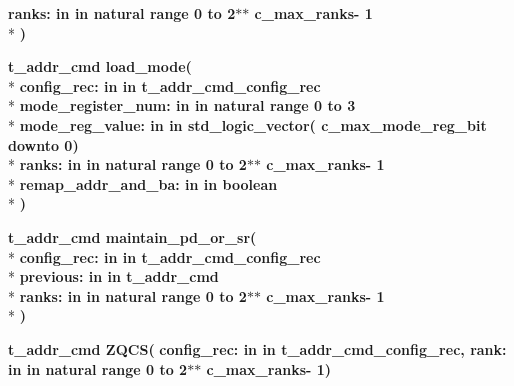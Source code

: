 \begin{DoxyCompactItemize}
{\bfseries \textcolor{vhdlchar}{ranks\+: }\textcolor{stringliteral}{in }\textcolor{vhdlchar}{in natural   range  0 to  2$\ast$$\ast$   c\+\_\+max\+\_\+ranks-\/ 1}}\\*
{\bfseries  )} 
\item 
{\bfseries {\bfseries \textcolor{vhdlchar}{t\+\_\+addr\+\_\+cmd}\textcolor{vhdlchar}{ }}} {\bf load\+\_\+mode}{\bfseries  ( }\\*
{\bfseries \textcolor{vhdlchar}{config\+\_\+rec\+: }\textcolor{stringliteral}{in }\textcolor{vhdlchar}{in t\+\_\+addr\+\_\+cmd\+\_\+config\+\_\+rec}}\\*
{\bfseries \textcolor{vhdlchar}{mode\+\_\+register\+\_\+num\+: }\textcolor{stringliteral}{in }\textcolor{vhdlchar}{in natural   range  0 to  3}}\\*
{\bfseries \textcolor{vhdlchar}{mode\+\_\+reg\+\_\+value\+: }\textcolor{stringliteral}{in }\textcolor{vhdlchar}{in std\+\_\+logic\+\_\+vector(   c\+\_\+max\+\_\+mode\+\_\+reg\+\_\+bit downto  0)}}\\*
{\bfseries \textcolor{vhdlchar}{ranks\+: }\textcolor{stringliteral}{in }\textcolor{vhdlchar}{in natural   range  0 to  2$\ast$$\ast$   c\+\_\+max\+\_\+ranks-\/ 1}}\\*
{\bfseries \textcolor{vhdlchar}{remap\+\_\+addr\+\_\+and\+\_\+ba\+: }\textcolor{stringliteral}{in }\textcolor{vhdlchar}{in boolean}}\\*
{\bfseries  )} 
\item 
{\bfseries {\bfseries \textcolor{vhdlchar}{t\+\_\+addr\+\_\+cmd}\textcolor{vhdlchar}{ }}} {\bf maintain\+\_\+pd\+\_\+or\+\_\+sr}{\bfseries  ( }\\*
{\bfseries \textcolor{vhdlchar}{config\+\_\+rec\+: }\textcolor{stringliteral}{in }\textcolor{vhdlchar}{in t\+\_\+addr\+\_\+cmd\+\_\+config\+\_\+rec}}\\*
{\bfseries \textcolor{vhdlchar}{previous\+: }\textcolor{stringliteral}{in }\textcolor{vhdlchar}{in t\+\_\+addr\+\_\+cmd}}\\*
{\bfseries \textcolor{vhdlchar}{ranks\+: }\textcolor{stringliteral}{in }\textcolor{vhdlchar}{in natural   range  0 to  2$\ast$$\ast$   c\+\_\+max\+\_\+ranks-\/ 1}}\\*
{\bfseries  )} 
\item 
{\bfseries {\bfseries \textcolor{vhdlchar}{t\+\_\+addr\+\_\+cmd}\textcolor{vhdlchar}{ }}} {\bf Z\+Q\+CS}{\bfseries  ( }{\bfseries \textcolor{vhdlchar}{config\+\_\+rec\+: }\textcolor{stringliteral}{in }\textcolor{vhdlchar}{in t\+\_\+addr\+\_\+cmd\+\_\+config\+\_\+rec}}{\bfseries  , \textcolor{vhdlchar}{rank\+: }\textcolor{stringliteral}{in }\textcolor{vhdlchar}{in natural   range  0 to  2$\ast$$\ast$   c\+\_\+max\+\_\+ranks-\/ 1}}{\bfseries  )} 

\end{DoxyCompactItemize}
